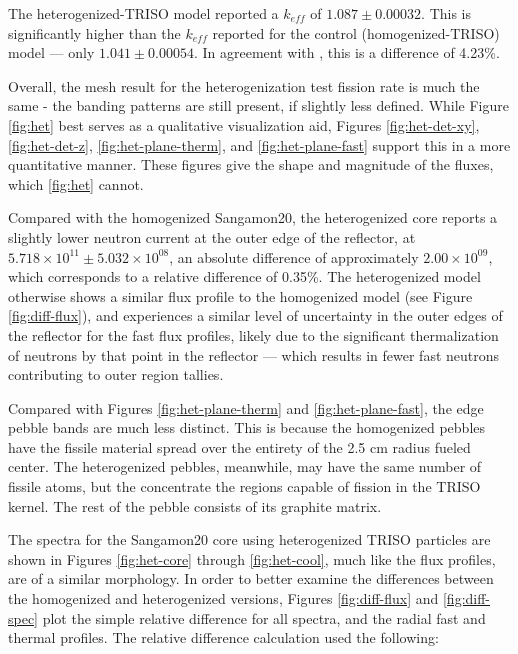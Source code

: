 

The heterogenized-TRISO model reported a $k_{eff}$ of $1.087 \pm 0.00032$.  This is significantly higher than the $k_{eff}$ reported for the control (homogenized-TRISO) model --- only $1.041 \pm 0.00054$.  In agreement with \cite{brown_stochastic_2005}, this is a difference of 4.23\%.  

Overall, the mesh result for the heterogenization test fission rate is much the same - the banding patterns are still present, if slightly less defined.  While Figure \ref{fig:het} best serves as a qualitative visualization aid, Figures \ref{fig:het-det-xy}, \ref{fig:het-det-z}, \ref{fig:het-plane-therm}, and \ref{fig:het-plane-fast} support this in a more quantitative manner.  These figures give the shape and magnitude of the fluxes, which \ref{fig:het} cannot.




Compared with the homogenized Sangamon20, the heterogenized core reports a slightly lower neutron current at the outer edge of the reflector, at $5.718\times10^{11} \pm 5.032\times10^{08}$, an absolute difference of approximately $2.00\times10^{09}$, which corresponds to a relative difference of 0.35\%.  The heterogenized model otherwise shows a similar flux profile to the homogenized model (see Figure \ref{fig:diff-flux}), and experiences a similar level of uncertainty in the outer edges of the reflector for the fast flux profiles, likely due to the significant thermalization of neutrons by that point in the reflector --- which results in fewer fast neutrons contributing to outer region tallies.







Compared with Figures  \ref{fig:het-plane-therm} and \ref{fig:het-plane-fast}, the edge pebble bands are much less distinct.  This is because the homogenized pebbles have the fissile material spread over the entirety of the 2.5 cm radius fueled center.  The heterogenized pebbles, meanwhile, may have the same number of fissile atoms, but the concentrate the regions capable of fission in the TRISO kernel.  The rest of the pebble consists of its graphite matrix.




The spectra for the Sangamon20 core using heterogenized TRISO particles are shown in Figures \ref{fig:het-core} through \ref{fig:het-cool}, much like the flux profiles, are of a similar morphology.  In order to better examine the differences between the homogenized and heterogenized versions, Figures \ref{fig:diff-flux} and \ref{fig:diff-spec} plot the simple relative difference for all spectra, and the radial fast and thermal profiles.  The relative difference calculation used the following:


